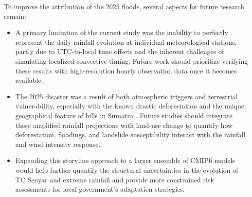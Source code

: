 To improve the attribution of the 2025 floods, several aspects for future research remain:
\begin{itemize}
    \item A primary limitation of the current study was the inability to perfectly represent the daily rainfall evolution at individual meteorological stations, partly due to UTC-to-local time offsets and the inherent challenges of simulating localized convective timing. Future work should prioritize verifying these results with high-resolution hourly observation data once it becomes available.
    \item The 2025 disaster was a result of both atmospheric triggers and terrestrial vulnerability, especially with the known drastic deforestation and the unique geographical feature of hills in Sumatra \citep{wu2026analysis, wwa}. Future studies should integrate these amplified rainfall projections with land-use change to quantify how deforestation, floodings, and landslide susceptibility interact with the rainfall and wind intensity response.
    \item Expanding this storyline approach to a larger ensemble of CMIP6 models would help further quantify the structural uncertainties in the evolution of TC Senyar and extreme rainfall and provide more constrained risk assessments for local government’s adaptation strategies.
\end{itemize}